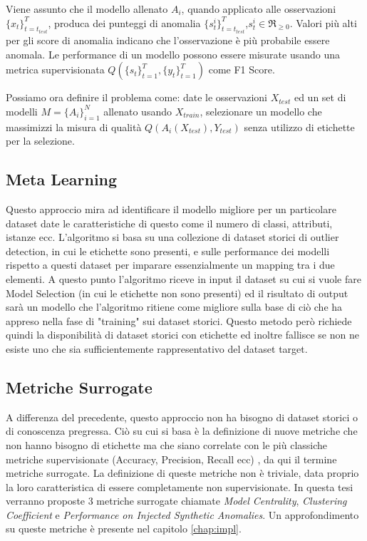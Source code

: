 Viene assunto che il modello allenato \(A_i\), quando applicato alle osservazioni \(\{x_t\}^{T}_{t=t_{test}}\), produca dei punteggi di anomalia \(\{s_t^i\}_{t=t_{test}}^T\),\(s^i_t\in\Re_{\geq0}\). Valori più alti per gli score di anomalia indicano che l'osservazione è più probabile essere anomala.
Le performance di un modello possono essere misurate usando una metrica supervisionata \(Q(\{s_t\}^T_{t=1},\{y_t\}^T_{t=1})\) come F1 Score.

Possiamo ora definire il problema come: date le osservazioni \(X_{test}\) ed un set di modelli \(M=\{A_i\}^N_{i=1}\) allenato usando \(X_{train}\), selezionare un modello che massimizzi la misura di qualità \(Q(A_i(X_{test}),Y_{test})\) senza utilizzo di etichette per la selezione.

\subsection{Meta Learning}
Questo approccio mira ad identificare il modello migliore per un particolare dataset date le caratteristiche di questo come il numero di classi, attributi, istanze ecc. L'algoritmo si basa su una collezione di dataset storici di outlier detection, in cui le etichette sono presenti, e sulle performance dei modelli rispetto a questi dataset per imparare essenzialmente un mapping tra i due elementi. 
A questo punto l'algoritmo riceve in input il dataset su cui si vuole fare Model Selection (in cui le etichette non sono presenti) ed il risultato di output sarà un modello che l'algoritmo ritiene come migliore sulla base di ciò che ha appreso nella fase di "training" sui dataset storici.
Questo metodo però richiede quindi la disponibilità di dataset storici con etichette ed inoltre fallisce se non ne esiste uno che sia sufficientemente rappresentativo del dataset target.
\subsection{Metriche Surrogate}
A differenza del precedente, questo approccio non ha bisogno di dataset storici o di conoscenza pregressa. Ciò su cui si basa è la definizione di nuove metriche che non hanno bisogno di etichette ma che siano correlate con le più classiche metriche supervisionate (Accuracy, Precision, Recall ecc) \cite{DBLP:journals/corr/abs-2104-01422}, da qui il termine metriche surrogate.
La definizione di queste metriche non è triviale, data proprio la loro caratteristica di essere completamente non supervisionate. In questa tesi verranno proposte 3 metriche surrogate chiamate \textit{Model Centrality}, \textit{Clustering Coefficient} e \textit{Performance on Injected Synthetic Anomalies}. Un approfondimento su queste metriche è presente nel capitolo \ref{chap:impl}.


